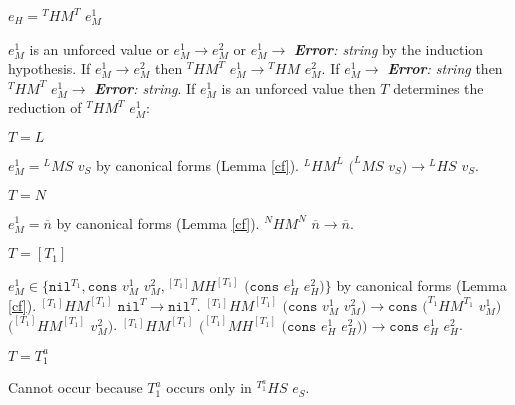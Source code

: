 \begin{case}

$e_{H}={^{T}H}M^{T}$ $e_{M}^{1}$

$e_{M}^{1}$ is an unforced value or $e_{M}^{1}\rightarrow e_{M}^{2}$ or $e_{M}^{1}\rightarrow$ \emph{\textbf{Error}: string} by the induction hypothesis.  If $e_{M}^{1}\rightarrow e_{M}^{2}$ then $^{T}HM^{T}$ $e_{M}^{1}\rightarrow{^{T}H}M$ $e_{M}^{2}$.  If $e_{M}^{1}\rightarrow$ \emph{\textbf{Error}: string} then $^{T}HM^{T}$ $e_{M}^{1}\rightarrow$ \emph{\textbf{Error}: string}.  If $e_{M}^{1}$ is an unforced value then $T$ determines the reduction of $^{T}HM^{T}$ $e_{M}^{1}$:

\begin{subcase}

$T=L$

$e_{M}^{1}={^{L}M}S$ $v_{S}$ by canonical forms (Lemma \ref{cf}).  $^{L}HM^{L}$ $(^{L}MS$ $v_{S})\rightarrow{^{L}H}S$ $v_{S}$.

\end{subcase}

\begin{subcase}

$T=N$

$e_{M}^{1}=\overline{n}$ by canonical forms (Lemma \ref{cf}).  $^{N}HM^{N}$ $\overline{n}\rightarrow\overline{n}$.

\end{subcase}

\begin{subcase}

$T=[T_{1}]$

$e_{M}^{1}\in\lbrace\mathtt{nil}^{T_{1}},\mathtt{cons}$ $v_{M}^{1}$ $v_{M}^{2},{^{[T_{1}]}M}H^{[T_{1}]}$ $(\mathtt{cons}$ $e_{H}^{1}$ $e_{H}^{2})\rbrace$ by canonical forms (Lemma \ref{cf}).  $^{[T_{1}]}HM^{[T_{1}]}$ $\mathtt{nil}^{T}\rightarrow\mathtt{nil}^{T}$.  $^{[T_{1}]}HM^{[T_{1}]}$ $(\mathtt{cons}$ $v_{M}^{1}$ $v_{M}^{2})\rightarrow\mathtt{cons}$ $(^{T_{1}}HM^{T_{1}}$ $v_{M}^{1})$ $(^{[T_{1}]}HM^{[T_{1}]}$ $v_{M}^{2})$.  $^{[T_{1}]}HM^{[T_{1}]}$ $(^{[T_{1}]}MH^{[T_{1}]}$ $(\mathtt{cons}$ $e_{H}^{1}$ $e_{H}^{2}))\rightarrow\mathtt{cons}$ $e_{H}^{1}$ $e_{H}^{2}$.

\end{subcase}

\begin{subcase}

$T=T_{1}^{a}$

Cannot occur because $T_{1}^{a}$ occurs only in $^{T_{1}^{a}}HS$ $e_{S}$.


\end{subcase}
\end{case}
